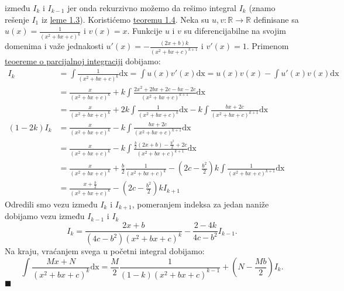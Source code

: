 \documentclass{article}
\begin{document}
između $I_k$ i $I_{k-1}$ jer onda rekurzivno možemo da
rešimo integral $I_k$ (znamo rešenje $I_1$ iz \hyperref[lema_1.3]{leme 1.3}). Koristićemo \hyperref[teorema_1.4]{teoremu 1.4}.
Neka su $u,v:\mathbb{R}\longrightarrow\mathbb{R}$ definisane sa $\displaystyle u\left(x\right)=\frac{1}{\left(x^2+bx+c\right)^k}$
i $v\left(x\right)=x$. Funkcije $u$ i $v$ su diferencijabilne na svojim domenima i
važe jednakosti $\displaystyle u'\left(x\right)=-\frac{\left(2x+b\right)k}{\left(x^2+bx+c\right)^{k+1}}$ i $v'\left(x\right)=1$.
Primenom \hyperref[teorema_1.4]{teoereme o parcijalnoj integraciji} dobijamo:
\begin{align*}
    I_k                  & =\int\frac{1}{\left(x^2+bx+c\right)^k}\text{dx} =\int u\left(x\right)v'\left(x\right)\text{dx} =u\left(x\right)v\left(x\right)-\int u'\left(x\right)v\left(x\right)\text{dx} \\
                         & =\frac{x}{\left(x^2+bx+c\right)^k}+k\int\frac{2x^2+2bx+2c-bx-2c}{\left(x^2+bx+c\right)^{k+1}} \text{dx}                                                                      \\
                         & =\frac{x}{\left(x^2+bx+c\right)^k}+2k\int\frac{1}{\left(x^2+bx+c\right)^k}\text{dx}-k\int\frac{bx+2c}{\left(x^2+bx+c\right)^{k+1}} \text{dx}                                 \\
    \left(1-2k\right)I_k & =\frac{x}{\left(x^2+bx+c\right)^k}-k\int\frac{bx+2c}{\left(x^2+bx+c\right)^{k+1}} \text{dx}                                                                                  \\
                         & =\frac{x}{\left(x^2+bx+c\right)^k}-k\int\frac{\frac{b}{2}\left(2x+b\right)-\frac{b^2}{2}+2c}{\left(x^2+bx+c\right)^{k+1}} \text{dx}                                          \\
                         & =\frac{x}{\left(x^2+bx+c\right)^k}+\frac{b}{2}\frac{1}{\left(x^2+bx+c\right)^{k}}-\left(2c-\frac{b^2}{2}\right)k\int\frac{1}{\left(x^2+bx+c\right)^{k+1}} \text{dx}          \\
                         & =\frac{x+\frac{b}{2}}{\left(x^2+bx+c\right)^k}-\left(2c-\frac{b^2}{2}\right)kI_{k+1}
\end{align*}
Odredili smo vezu između $I_k$ i $I_{k+1}$, pomeranjem indeksa za jedan
naniže dobijamo vezu između $I_{k-1}$ i $I_k$
$$I_k =\frac{2x+b}{\left(4c-b^2\right)\left(x^2+bx+c\right)^k}-\frac{2-4k}{4c-b^2}I_{k-1}.$$
Na kraju, vraćanjem svega u početni integral dobijamo:
$$    \int \frac{Mx+N}{\left(x^2+bx+c\right)^k}\text{dx}=\frac{M}{2}\frac{1}{\left(1-k\right)\left(x^2+bx+c\right)^{k-1}}+\left(N-\frac{Mb}{2}\right)I_k.$$
\null\hfill $\blacksquare$\par
\end{document}
